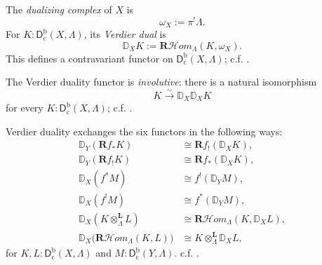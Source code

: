 \documentclass[11pt,letterpaper]{article}
\theoremstyle{numberfirstplain}
\numberwithin{equation}{theorem}
\theoremstyle{numberfirstupright}
\begin{document}
\begin{definition}\label{def:verdier-dual}
The \textit{dualizing complex} of $X$ is $$\omega_X:=\pi^!\Lambda.$$
For $K:\mathsf D_{\mathrm c}^{\mathrm b}(X,\Lambda)$, its \textit{Verdier dual} is
\[
\mathbb D_XK:=\mathbf R\mathcal Hom_\Lambda(K,\omega_X).
\]
This defines a contravariant functor on $\mathsf D_{\mathrm c}^{\mathrm b}(X,\Lambda)$; c.f. \cite[\S2.2.1]{Katz1996}.
\end{definition}


The Verdier duality functor is \textit{involutive}: there is a natural isomorphism 
\[
K\xrightarrow{\sim}\mathbb D_X\mathbb D_XK
\]
for every $K:\mathsf D_{\mathrm c}^{\mathrm b}(X,\Lambda)$; c.f. \cite[\S2.2.1]{Katz1996}.

Verdier duality exchanges the six functors in the following ways:
\[
\begin{aligned}
\mathbb D_Y(\mathbf Rf_*K)
&\cong\mathbf Rf_!(\mathbb D_XK),\\
\mathbb D_Y(\mathbf Rf_!K)
&\cong\mathbf Rf_*(\mathbb D_XK),\\
\mathbb D_X(f^*M)
&\cong f^!(\mathbb D_YM),\\
\mathbb D_X(f^!M)
&\cong f^*(\mathbb D_YM),\\
\mathbb D_X(K\otimes_\Lambda^{\mathbf L}L)
&\cong\mathbf R\mathcal Hom_\Lambda(K,\mathbb D_XL),\\
\mathbb D_X\bigl(\mathbf R\mathcal Hom_\Lambda(K,L)\bigr)
&\cong K\otimes_\Lambda^{\mathbf L}\mathbb D_XL,
\end{aligned}
\]
for $K,L:\mathsf D_{\mathrm c}^{\mathrm b}(X,\Lambda)$ and $M:\mathsf D_{\mathrm c}^{\mathrm b}(Y,\Lambda)$.
c.f. \cite[\S2.1.2(4)--(5) and \S2.2.1]{Katz1996}.
\end{document}
